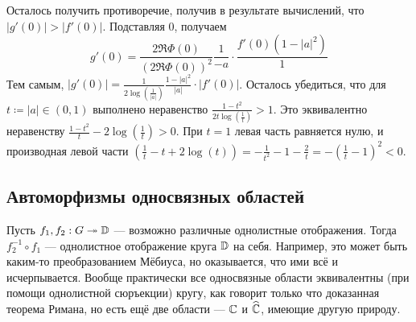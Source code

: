 \documentclass[a4paper]{report}
\begin{document}
{{{                \item Осталось получить противоречие, получив в результате вычислений, что $|g'(0)| > |f'(0)|$.
                Подставляя $0$, получаем
                \[g'(0) = \frac{2\Re\Phi(0)}{(2\Re\Phi(0))^2}\frac{1}{-a} \cdot \frac{f'(0)(1 - |a|^2)}{1}\]
                Тем самым, $|g'(0)| = \frac{1}{2 \log\left(\frac{1}{|a|}\right)}\frac{1 - |a|^2}{|a|} \cdot |f'(0)|$.
                Осталось убедиться, что для $t \coloneqq |a| \in (0, 1)$ выполнено неравенство $\frac{1 - t^2}{2t \log\left(\frac{1}{t}\right)} > 1$.
                Это эквивалентно неравенству $\frac{1 - t^2}{t} - 2\log\left(\frac{1}{t}\right) > 0$.
                При $t = 1$ левая часть равняется нулю, и производная левой части $\left(\frac{1}{t} - t + 2\log\left(t\right)\right) = -\frac{1}{t^2} - 1 - \frac{2}{t} = -\left(\frac{1}{t} - 1\right)^2 < 0$.
            }
        }
    }
    \subsection{Автоморфизмы односвязных областей}
    Пусть $f_1, f_2: G \twoheadrightarrow \mathbb{D}$ --- возможно различные однолистные отображения.
    Тогда $f_2^{-1} \circ f_1$ --- однолистное отображение круга $\mathbb{D}$ на себя.
    Например, это может быть каким-то преобразованием Мёбиуса, но оказывается, что ими всё и исчерпывается.
    Вообще практически все односвязные области эквивалентны (при помощи однолистной сюръекции) кругу, как говорит только что доказанная теорема Римана, но есть ещё две области --- $\mathbb{C}$ и $\widehat{\mathbb{C}}$, имеющие другую природу.
\end{document}

